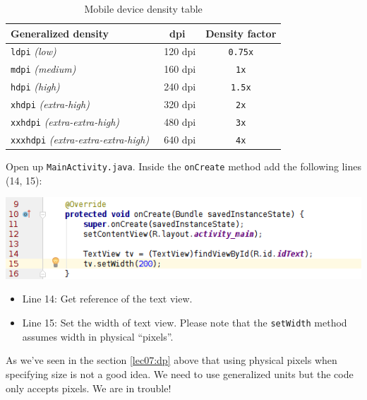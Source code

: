 \begin{table}
	\begin{center}
		\begin{tabular}{|l|c|c|}
			\hline \textbf{Generalized density}	& \textbf{dpi} & \textbf{Density factor} \\
			\hline
			\hline \texttt{ldpi} \textit{(low)} & ~120 dpi & \texttt{0.75x} \\
			\hline \texttt{mdpi} \textit{(medium)} &  ~160 dpi & \texttt{1x} \\
			\hline \texttt{hdpi} \textit{(high)} & ~240 dpi & \texttt{1.5x} \\
			\hline \texttt{xhdpi} \textit{(extra-high)} & ~320 dpi & \texttt{2x} \\
			\hline \texttt{xxhdpi} \textit{(extra-extra-high)} & ~480 dpi & \texttt{3x} \\
			\hline \texttt{xxxhdpi} \textit{(extra-extra-extra-high)} & ~640 dpi & \texttt{4x} \\
			\hline 
		\end{tabular} 
	\end{center}
	\caption{Mobile device density table}\label{lec07:densityChart}
\end{table}

Open up \texttt{MainActivity.java}. Inside the \texttt{onCreate} method add the following lines (14, 15):

\begin{center}
	\includegraphics[scale=0.4]{chapters/ch06/images/4}
\end{center} 

\begin{itemize}
	\item Line 14: Get reference of the text view.
	\item Line 15: Set the width of text view. Please note that the \texttt{setWidth} method assumes width in physical ``pixels''.
\end{itemize}

As we've seen in the section \ref{lec07:dp} above that using physical pixels when specifying size is not a good idea. We need to use generalized units but the code only accepts pixels. We are in trouble!

